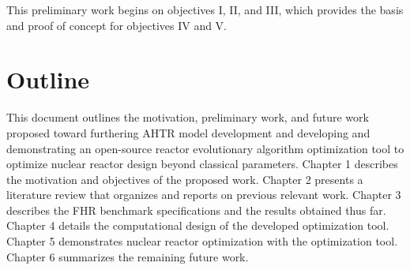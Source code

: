 This preliminary work begins on objectives I, II, and III, which provides 
the basis and proof of concept for objectives IV and V. 

\section{Outline}
This document outlines the motivation, preliminary work, and future work proposed 
toward furthering \gls{AHTR} model development and developing and demonstrating 
an open-source reactor evolutionary algorithm optimization tool to optimize 
nuclear reactor design beyond classical parameters. 
Chapter 1 describes the motivation and objectives of the proposed work. 
Chapter 2 presents a literature review that organizes and reports on previous 
relevant work. 
Chapter 3 describes the \gls{FHR} benchmark specifications and the results 
obtained thus far. 
Chapter 4 details the computational design of the developed optimization 
tool. 
Chapter 5 demonstrates nuclear reactor optimization with the optimization 
tool.  
Chapter 6 summarizes the remaining future work. 
